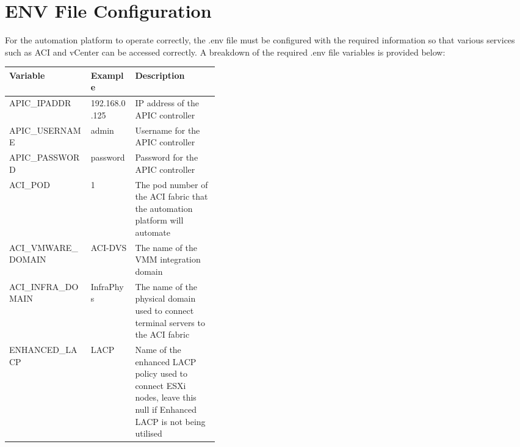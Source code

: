 \section*{ENV File Configuration}
For the automation platform to operate correctly, the .env file must be configured with the required information so that various services such as ACI and vCenter can be accessed correctly. A breakdown of the required .env file variables is provided below:
\begin{table}[H]
    \centering
    \begin{tabular}{l l p{0.4\linewidth}}
        \textbf{Variable}   & \textbf{Example} & \textbf{Description}                                                                                                \\
        \hline
        APIC\_IPADDR        & 192.168.0.125    & IP address of the APIC controller                                                                                   \\             \hline
        APIC\_USERNAME      & admin            & Username for the APIC controller                                                                                    \\            \hline
        
        APIC\_PASSWORD      & password         & Password for the APIC controller                                                                                    \\            \hline
        
        ACI\_POD            & 1                & The pod number of the ACI fabric that the automation platform will automate                                         \\            \hline
        
        ACI\_VMWARE\_DOMAIN & ACI-DVS          & The name of the VMM integration domain                                                                              \\            \hline
        
        ACI\_INFRA\_DOMAIN  & InfraPhys        & The name of the physical domain used to connect terminal servers to the ACI fabric                                  \\            \hline
        
        ENHANCED\_LACP      & LACP             & Name of the enhanced LACP policy used to connect ESXi nodes, leave this null if Enhanced LACP is not being utilised \\            \hline
        

\end{tabular}
\end{table}
